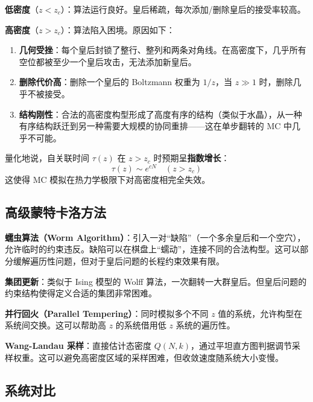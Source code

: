 \documentclass[12pt,a4paper]{ctexart}
\begin{document}
\textbf{低密度}（$z < z_c$）：算法运行良好。皇后稀疏，每次添加/删除皇后的接受率较高。

\textbf{高密度}（$z > z_c$）：算法陷入困境。原因如下：

\begin{enumerate}
\item \textbf{几何受挫}：每个皇后封锁了整行、整列和两条对角线。在高密度下，几乎所有空位都被至少一个皇后攻击，无法添加新皇后。
\item \textbf{删除代价高}：删除一个皇后的 Boltzmann 权重为 $1/z$，当 $z \gg 1$ 时，删除几乎不被接受。
\item \textbf{结构刚性}：合法的高密度构型形成了高度有序的结构（类似于水晶），从一种有序结构跃迁到另一种需要大规模的协同重排——这在单步翻转的 MC 中几乎不可能。
\end{enumerate}

量化地说，自关联时间 $\tau(z)$ 在 $z > z_c$ 时预期呈\textbf{指数增长}：
\begin{equation}
\tau(z) \sim e^{c N} \quad (z > z_c)
\end{equation}
这使得 MC 模拟在热力学极限下对高密度相完全失效。

\subsection{高级蒙特卡洛方法}

\textbf{蠕虫算法（Worm Algorithm）}：引入一对``缺陷''（一个多余皇后和一个空穴），允许临时的约束违反。缺陷可以在棋盘上``蠕动''，连接不同的合法构型。这可以部分缓解遍历性问题，但对于皇后问题的长程约束效果有限。

\textbf{集团更新}：类似于 Ising 模型的 Wolff 算法，一次翻转一大群皇后。但皇后问题的约束结构使得定义合适的集团非常困难。

\textbf{并行回火（Parallel Tempering）}：同时模拟多个不同 $z$ 值的系统，允许构型在系统间交换。这可以帮助高 $z$ 的系统借用低 $z$ 系统的遍历性。

\textbf{Wang-Landau 采样}：直接估计态密度 $Q(N,k)$，通过平坦直方图判据调节采样权重。这可以避免高密度区域的采样困难，但收敛速度随系统大小变慢。

\subsection{系统对比}
\end{document}
